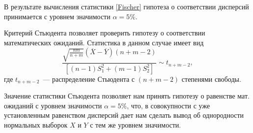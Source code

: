     В результате вычисления статистики \eqref{Fischer} гипотеза о соответствии 
    дисперсий принимается с уровнем значимости $\alpha = 5\%$.

    Критерий Стьюдента позволяет проверить гипотезу о соответствии математических
    ожиданий. Статистика в данном случае имеет вид
    \begin{equation}
        \frac{\sqrt{\frac{nm}{n+m}}(\overline X - \overline Y) (n+m-2)} 
        {[(n-1)S_1^2 + (m-1)S_2^2]} \sim t_{n+m-2},
    \end{equation}
    где $t_{n+m-2}$~--- распределение Стьюдента с $(n+m-2)$ степенями свободы.

    Значение статистики Стьюдента позволяет нам принять гипотезу о равенстве 
    мат. ожиданий с уровнем значимости $\alpha = 5\%$, что, в совокупности с уже
    установленным равенством дисперсий дает нам сделать вывод об 
    однородности нормальных выборок $X$ и $Y$ с тем же уровнем значимости.

